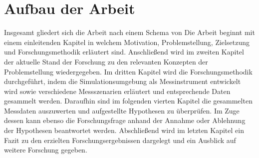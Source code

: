 \section{Aufbau der Arbeit}

Insgesamt gliedert sich die Arbeit nach einem Schema von \cite[]{Holzweiig.2022}
Die Arbeit beginnt mit einem einleitenden Kapitel in welchem Motivation, Problemstellung, Zielsetzung und Forschungsmethodik erläutert sind.
Anschließend wird im zweiten Kapitel der aktuelle Stand der Forschung zu den relevanten Konzepten der Problemstellung wiedergegeben.
Im dritten Kapitel wird die Forschungsmethodik durchgeführt, indem die Simulationsumgebung als Messinstrument entwickelt wird sowie verschiedene Messszenarien erläutert und entsprechende Daten gesammelt werden. 
Daraufhin sind im folgenden vierten Kapitel die gesammelten Messdaten auszuwerten und aufgestellte Hypothesen zu überprüfen.
Im Zuge dessen kann ebenso die Forschungsfrage anhand der Annahme oder Ablehnung der Hypothesen beantwortet werden.
Abschließend wird im letzten Kapitel ein Fazit zu den erzielten Forschungsergebnissen dargelegt und ein Ausblick auf weitere Forschung gegeben.